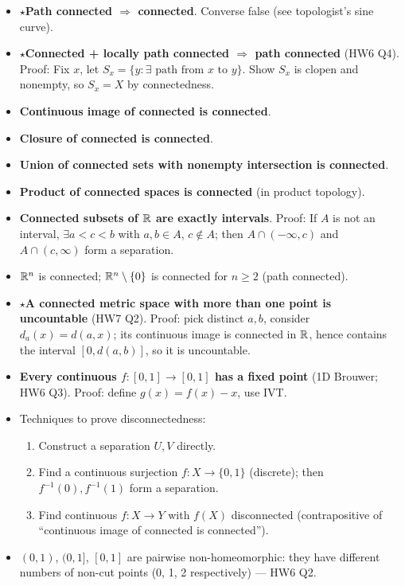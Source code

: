 \documentclass{article}
\newcommand{\starKey}{\textcolor{red!65!black}{\textbf{$\star$}}}
\begin{document}
\begin{itemize}
  \item \starKey \textbf{Path connected $\Rightarrow$ connected}.
  Converse false (see topologist's sine curve).
  \item \starKey \textbf{Connected + locally path connected $\Rightarrow$ path connected}
  (HW6 Q4).
  Proof: Fix $x$, let $S_x=\{y:\exists\text{ path from }x\text{ to }y\}$.
  Show $S_x$ is clopen and nonempty, so $S_x=X$ by connectedness.
  \item \textbf{Continuous image of connected is connected}.
  \item \textbf{Closure of connected is connected}.
  \item \textbf{Union of connected sets with nonempty intersection is connected}.
  \item \textbf{Product of connected spaces is connected} (in product topology).
  \item \textbf{Connected subsets of $\mathbb{R}$ are exactly intervals}.
  Proof: If $A$ is not an interval, $\exists a<c<b$ with $a,b\in A$, $c\notin A$;
  then $A\cap(-\infty,c)$ and $A\cap(c,\infty)$ form a separation.
  \item $\mathbb{R}^n$ is connected; $\mathbb{R}^n\setminus\{0\}$ is connected for $n\ge2$ (path connected).
  \item \starKey \textbf{A connected metric space with more than one point is uncountable}
  (HW7 Q2).
  Proof: pick distinct $a,b$, consider $d_a(x)=d(a,x)$; its continuous image is connected
  in $\mathbb{R}$, hence contains the interval $[0,d(a,b)]$, so it is uncountable.
  \item \textbf{Every continuous $f:[0,1]\to[0,1]$ has a fixed point}
  (1D Brouwer; HW6 Q3).
  Proof: define $g(x)=f(x)-x$, use IVT.
  \item Techniques to prove disconnectedness:
  \begin{enumerate}
    \item Construct a separation $U,V$ directly.
    \item Find a continuous surjection $f:X\to\{0,1\}$ (discrete);
    then $f^{-1}(0),f^{-1}(1)$ form a separation.
    \item Find continuous $f:X\to Y$ with $f(X)$ disconnected
    (contrapositive of ``continuous image of connected is connected'').
  \end{enumerate}
  \item $(0,1)$, $(0,1]$, $[0,1]$ are pairwise non-homeomorphic:
  they have different numbers of non-cut points (0, 1, 2 respectively) --- HW6 Q2.
\end{itemize}
\end{document}
